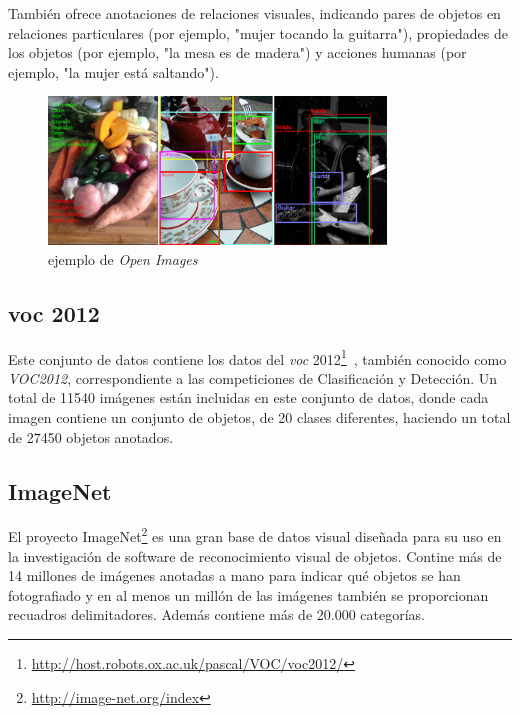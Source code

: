 También ofrece anotaciones de relaciones visuales, indicando pares de objetos en relaciones particulares (por ejemplo, "mujer tocando la guitarra"), propiedades de los objetos (por ejemplo, "la mesa es de madera") y acciones humanas (por ejemplo, "la mujer está saltando").

\begin{figure}[H]
  \begin{center}
    \includegraphics[width=0.8\textwidth]{figures/estado_arte/openImages.png}
		\caption{ejemplo de \textit{Open Images}}
		\label{fig.oi}
		\end{center}
\end{figure}

\subsection{\acrfull{voc} 2012}

Este conjunto de datos contiene los datos del \textit{\acrfull{voc}} 2012\footnote{\url{http://host.robots.ox.ac.uk/pascal/VOC/voc2012/}}~\cite{pascal-voc-2012}, también conocido como \textit{VOC2012}, correspondiente a las competiciones de Clasificación y Detección. Un total de 11540 imágenes están incluidas en este conjunto de datos, donde cada imagen contiene un conjunto de objetos, de 20 clases diferentes, haciendo un total de 27450 objetos anotados.

\subsection{ImageNet}
El proyecto ImageNet\footnote{\url{http://image-net.org/index}} es una gran base de datos visual diseñada para su uso en la investigación de software de reconocimiento visual de objetos. Contine más de 14 millones de imágenes anotadas a mano para indicar qué objetos se han fotografiado y en al menos un millón de las imágenes también se proporcionan recuadros delimitadores. Además contiene más de 20.000 categorías.
